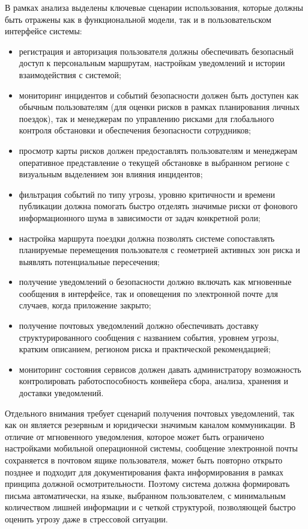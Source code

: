 В рамках анализа выделены ключевые сценарии использования, которые должны быть отражены как в функциональной модели, так и в пользовательском интерфейсе системы:
\begin{itemize}
    \item регистрация и авторизация пользователя должны обеспечивать безопасный доступ к персональным маршрутам, настройкам уведомлений и истории взаимодействия с системой;
    \item мониторинг инцидентов и событий безопасности должен быть доступен как обычным пользователям (для оценки рисков в рамках планирования личных поездок), так и менеджерам по управлению рисками для глобального контроля обстановки и обеспечения безопасности сотрудников;
    \item просмотр карты рисков должен предоставлять пользователям и менеджерам оперативное представление о текущей обстановке в выбранном регионе с визуальным выделением зон влияния инцидентов;
    \item фильтрация событий по типу угрозы, уровню критичности и времени публикации должна помогать быстро отделять значимые риски от фонового информационного шума в зависимости от задач конкретной роли;
    \item настройка маршрута поездки должна позволять системе сопоставлять планируемые перемещения пользователя с геометрией активных зон риска и выявлять потенциальные пересечения;
    \item получение уведомлений о безопасности должно включать как мгновенные сообщения в интерфейсе, так и оповещения по электронной почте для случаев, когда приложение закрыто;
    \item получение почтовых уведомлений должно обеспечивать доставку структурированного сообщения с названием события, уровнем угрозы, кратким описанием, регионом риска и практической рекомендацией;
    \item мониторинг состояния сервисов должен давать администратору возможность контролировать работоспособность конвейера сбора, анализа, хранения и доставки уведомлений.
\end{itemize}

Отдельного внимания требует сценарий получения почтовых уведомлений, так как он является резервным и юридически значимым каналом коммуникации. В отличие от мгновенного уведомления, которое может быть ограничено настройками мобильной операционной системы, сообщение электронной почты сохраняется в почтовом ящике пользователя, может быть повторно открыто позднее и подходит для документирования факта информирования в рамках принципа должной осмотрительности. Поэтому система должна формировать письма автоматически, на языке, выбранном пользователем, с минимальным количеством лишней информации и с четкой структурой, позволяющей быстро оценить угрозу даже в стрессовой ситуации.

